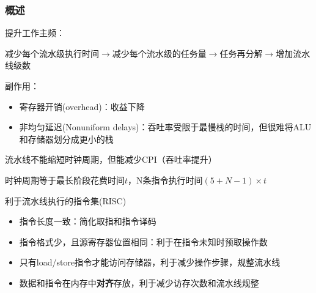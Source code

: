 \subsubsection{概述}
提升工作主频：
\begin{center}
减少每个流水级执行时间$\to$减少每个流水级的任务量$\to$任务再分解$\to$增加流水线级数
\end{center}
\par 副作用：
\begin{itemize}
	\item 寄存器开销(overhead)：收益下降
	\item 非均匀延迟(Nonuniform delays)：吞吐率受限于最慢栈的时间，但很难将ALU和存储器划分成更小的栈
\end{itemize}
\par 流水线不能缩短时钟周期，但能减少CPI（吞吐率提升）
\par 时钟周期等于最长阶段花费时间$t$，N条指令执行时间$(5+N-1)\times t$
\par 利于流水线执行的指令集(RISC)
\begin{itemize}
	\item 指令长度一致：简化取指和指令译码
	\item 指令格式少，且源寄存器位置相同：利于在指令未知时预取操作数
	\item 只有load/store指令才能访问存储器，利于减少操作步骤，规整流水线
	\item 数据和指令在内存中\textbf{对齐}存放，利于减少访存次数和流水线规整
\end{itemize}

